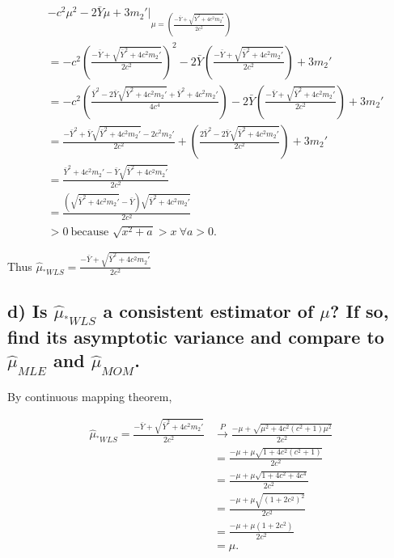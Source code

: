 \documentclass[
  letterpaper,
  DIV=11,
  numbers=noendperiod]{scrreprt}
\begin{document}
\[
\begin{aligned}
&- c^2\mu^2-2\bar{Y}\mu +3m_2' \bigg|_{\mu = \left(\frac{-\bar{Y} + \sqrt{\bar{Y}^2+4c^2m_2'}}{2c^2}\right)}\\
&=-c^2\left(\frac{-\bar{Y} + \sqrt{\bar{Y}^2+4c^2m_2'}}{2c^2}\right)^2-2\bar{Y}\left(\frac{-\bar{Y} + \sqrt{\bar{Y}^2+4c^2m_2'}}{2c^2}\right)+3m_2' \\
&=-c^2\left(\frac{\bar{Y}^2 -2\bar{Y} \sqrt{\bar{Y}^2+4c^2m_2'}+\bar{Y}^2+4c^2m_2'}{4c^4}\right)-2\bar{Y}\left(\frac{-\bar{Y} + \sqrt{\bar{Y}^2+4c^2m_2'}}{2c^2}\right)+3m_2' \\
&=\frac{-\bar{Y}^2 +\bar{Y} \sqrt{\bar{Y}^2+4c^2m_2'}-2c^2m_2'}{2c^2}+\left(\frac{2\bar{Y}^2 -2\bar{Y} \sqrt{\bar{Y}^2+4c^2m_2'}}{2c^2}\right)+3m_2' \\
&=\frac{\bar{Y}^2+4c^2m_2' -\bar{Y} \sqrt{\bar{Y}^2+4c^2m_2'}}{2c^2} \\
&=\frac{\left(\sqrt{\bar{Y}^2+4c^2m_2'} -\bar{Y}\right)\sqrt{\bar{Y}^2+4c^2m_2'}}{2c^2} \\
&>0~\text{because } \sqrt{x^2+a} > x~\forall a>0.
\end{aligned}
\]

Thus
\(\hat{\mu}_{^*{WLS}}=\frac{-\bar{Y} + \sqrt{\bar{Y}^2+4c^2m_2'}}{2c^2}\)

\newpage

\hypertarget{d-is-hatmu_wls-a-consistent-estimator-of-mu-if-so-find-its-asymptotic-variance-and-compare-to-hatmu_mle-and-hatmu_mom.}{%
\subsection{\texorpdfstring{d) Is \(\hat{\mu}_{^*{WLS}}\) a consistent
estimator of \(\mu\)? If so, find its asymptotic variance and compare to
\(\hat{\mu}_{MLE}\) and
\(\hat{\mu}_{MOM}\).}{d) Is \textbackslash hat\{\textbackslash mu\}\_\{\^{}*\{WLS\}\} a consistent estimator of \textbackslash mu? If so, find its asymptotic variance and compare to \textbackslash hat\{\textbackslash mu\}\_\{MLE\} and \textbackslash hat\{\textbackslash mu\}\_\{MOM\}.}}\label{d-is-hatmu_wls-a-consistent-estimator-of-mu-if-so-find-its-asymptotic-variance-and-compare-to-hatmu_mle-and-hatmu_mom.}}

By continuous mapping theorem,

\[
\begin{aligned}
\hat{\mu}_{^*{WLS}} =\frac{-\bar{Y} + \sqrt{\bar{Y}^2+4c^2m_2'}}{2c^2} &\overset{P}{\to} \frac{-\mu + \sqrt{\mu^2+4c^2(c^2+1)\mu^2}}{2c^2}\\
&=\frac{-\mu +\mu \sqrt{1+4c^2(c^2+1)}}{2c^2} \\
&=\frac{-\mu +\mu \sqrt{1+4c^2+ 4c^4}}{2c^2} \\
&=\frac{-\mu +\mu \sqrt{(1+2c^2)^2}}{2c^2} \\
&=\frac{-\mu +\mu (1+2c^2)}{2c^2} \\
&=\mu.
\end{aligned}
\]
\end{document}
